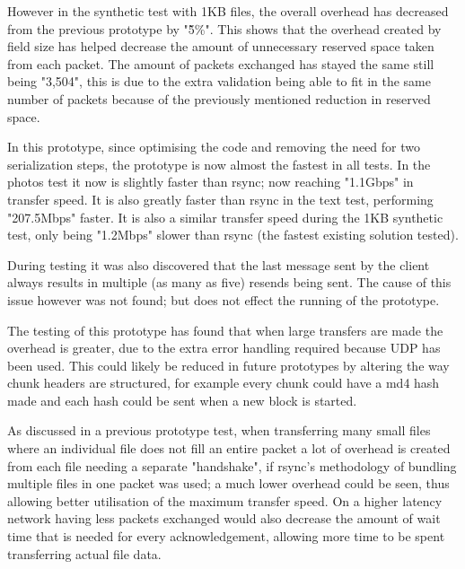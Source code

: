 However in the synthetic test with 1KB files, the overall overhead has decreased from the previous prototype by "\~5\%". This shows that the overhead created by field size has helped decrease the amount of unnecessary reserved space taken from each packet. The amount of packets exchanged has stayed the same still being "3,504", this is due to the extra validation being able to fit in the same number of packets because of the previously mentioned reduction in reserved space.

In this prototype, since optimising the code and removing the need for two serialization steps, the prototype is now almost the fastest in all tests. In the photos test it now is slightly faster than rsync; now reaching "1.1Gbps" in transfer speed. It is also greatly faster than rsync in the text test, performing "207.5Mbps" faster. It is also a similar transfer speed during the 1KB synthetic test, only being "1.2Mbps" slower than rsync (the fastest existing solution tested).

During testing it was also discovered that the last message sent by the client always results in multiple (as many as five) resends being sent. The cause of this issue however was not found; but does not effect the running of the prototype.

The testing of this prototype has found that when large transfers are made the overhead is greater, due to the extra error handling required because UDP has been used. This could likely be reduced in future prototypes by altering the way chunk headers are structured, for example every chunk could have a md4 hash made and each hash could be sent when a new block is started.

As discussed in a previous prototype test, when transferring many small files where an individual file does not fill an entire packet a lot of overhead is created from each file needing a separate "handshake", if rsync's methodology of bundling multiple files in one packet was used; a much lower overhead could be seen, thus allowing better utilisation of the maximum transfer speed. On a higher latency network having less packets exchanged would also decrease the amount of wait time that is needed for every acknowledgement, allowing more time to be spent transferring actual file data.
